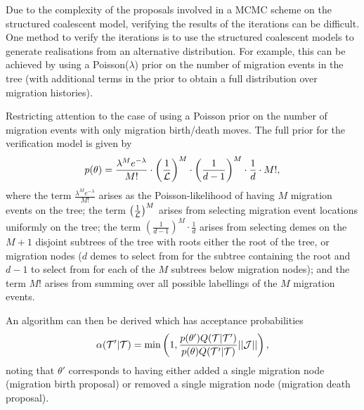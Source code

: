Due to the complexity of the proposals involved in a MCMC scheme on the structured coalescent model, verifying the results of the iterations can be difficult. One method to verify the iterations is to use the structured coalescent models to generate realisations from an alternative distribution. For example, this can be achieved by using a Poisson($\lambda$) prior on the number of migration events in the tree (with additional terms in the prior to obtain a full distribution over migration histories).

Restricting attention to the case of using a Poisson prior on the number of migration events with only migration birth/death moves. The full prior for the verification model is given by
\[
p(\theta) = \frac{\lambda^M e^{-\lambda}}{M!} \cdot \left( \frac{1}{\mathcal{L}} \right)^M \cdot \left( \frac{1}{d-1} \right)^M \cdot \frac{1}{d} \cdot M!,
\]
where the term $\frac{\lambda^M e^{-\lambda}}{M!}$ arises as the Poisson-likelihood of having $M$ migration events on the tree; the term $\left( \frac{1}{\mathcal{L}} \right)^M$ arises from selecting migration event locations uniformly on the tree; the term $\left( \frac{1}{d-1} \right)^M \cdot \frac{1}{d}$ arises from selecting demes on the $M+1$ disjoint subtrees of the tree with roots either the root of the tree, or migration nodes ($d$ demes to select from for the subtree containing the root and $d-1$ to select from for each of the $M$ subtrees below migration nodes); and the term $M!$ arises from summing over all possible labellings of the $M$ migration events.

An algorithm can then be derived which has acceptance probabilities
\[
\alpha (\mathcal{T}' | \mathcal{T}) = \min \left(1, \frac{p(\theta') Q(\mathcal{T} | \mathcal{T}')}{p(\theta) Q(\mathcal{T}' | \mathcal{T})} || \mathcal{J} ||\right),
\]
noting that $\theta'$ corresponds to having either added a single migration node (migration birth proposal) or removed a single migration node (migration death proposal).

